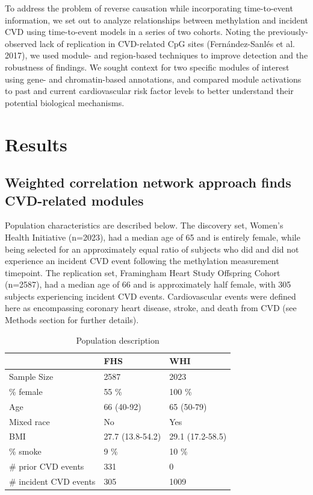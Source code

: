 \documentclass[]{article}
\theoremstyle{definition}
\theoremstyle{definition}
\theoremstyle{definition}
\theoremstyle{remark}
\begin{document}
To address the problem of reverse causation while incorporating
time-to-event information, we set out to analyze relationships between
methylation and incident CVD using time-to-event models in a series of
two cohorts. Noting the previously-observed lack of replication in
CVD-related CpG sites (Fern{á}ndez-Sanl{é}s et al. 2017), we used
module- and region-based techniques to improve detection and the
robustness of findings. We sought context for two specific modules of
interest using gene- and chromatin-based annotations, and compared
module activations to past and current cardiovascular risk factor levels
to better understand their potential biological mechanisms.

\section{Results}\label{results}

\subsection{Weighted correlation network approach finds CVD-related
modules}\label{weighted-correlation-network-approach-finds-cvd-related-modules}

Population characteristics are described below. The discovery set,
Women's Health Initiative (n=2023), had a median age of 65 and is
entirely female, while being selected for an approximately equal ratio
of subjects who did and did not experience an incident CVD event
following the methylation measurement timepoint. The replication set,
Framingham Heart Study Offspring Cohort (n=2587), had a median age of 66
and is approximately half female, with 305 subjects experiencing
incident CVD events. Cardiovascular events were defined here as
encompassing coronary heart disease, stroke, and death from CVD (see
Methods section for further details).

\begin{table}

\caption{\label{tab:population-description}Population description}
\centering
\begin{tabular}[t]{lll}
\toprule
  & FHS & WHI\\
\midrule
Sample Size & 2587 & 2023\\
\% female & 55  \% & 100  \%\\
Age & 66 (40-92) & 65 (50-79)\\
Mixed race & No & Yes\\
BMI & 27.7 (13.8-54.2) & 29.1 (17.2-58.5)\\
\addlinespace
\% smoke & 9 \% & 10 \%\\
\# prior CVD events & 331 & 0\\
\# incident CVD events & 305 & 1009\\
\bottomrule
\end{tabular}
\end{table}
\end{document}
